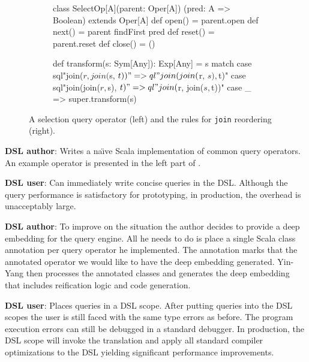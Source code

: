 \documentclass{llncs}
\newcommand{\scode}[1]{\lstinline[language=Scala,columns=fixed,basicstyle=\ttfamily,keywordstyle=\ttfamily]|#1|}
\newcommand{\code}[1]{\scode{#1}}
\newcommand{\tool}{Yin-Yang\xspace}
\begin{document}
\lstset{mathescape=false}
\begin{figure*}[ht]
\begin{multicols}{2}
\begin{subfigure}[b]{1\linewidth}
\centering

\begin{listingtiny}
class SelectOp[A](parent: Oper[A])
  (pred: A => Boolean) extends Oper[A]{
  def open() = parent.open
  def next() = parent findFirst pred    
  def reset() = parent.reset
  def close() = ()
}
\end{listingtiny}
\label{lst:shallow}
\end{subfigure}

\begin{subfigure}[b]{1\linewidth}
\begin{listingtiny}
def transform(s: Sym[Any]): Exp[Any] = s match {
  case sql"join($r, join($s, $t))" => 
    ql"join(join($r, $s), $t)"
  case sql"join(join($r, $s), $t)" => 
    ql"join($r, join($s, $t))"
  case _ => super.transform(s)
}
\end{listingtiny}

\end{subfigure}
\end{multicols}
\caption{\label{lst:select} A selection query operator (left) and the rules for \code{join} reordering (right).}
\end{figure*}

  {\bf DSL author}: Writes a na\"{\i}ve Scala implementation of common query operators. An example operator is presented in the left part of .

  {\bf DSL user}: Can immediately write concise queries in the DSL. Although the query performance is satisfactory for prototyping, in production, the overhead is unacceptably large.

  {\bf DSL author}: To improve on the situation the author decides to provide a deep embedding for the query engine. All he needs to do is place a single Scala class annotation per query operator he implemented. The annotation marks that the annotated operator we would like to have the deep embedding generated. \tool then processes the annotated classes and generates the deep embedding that includes reification logic and code generation.

  {\bf DSL user}: Places queries in a DSL scope. After putting queries into the DSL scopes the user is still faced with the same type errors as before. The program execution errors can still be debugged in a standard debugger. In production, the DSL scope will invoke the translation and apply all standard compiler optimizations to the DSL yielding significant performance improvements.
\end{document}
